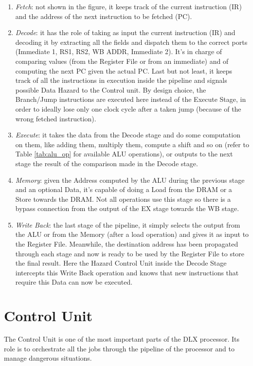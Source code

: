\begin{enumerate}
    \item \emph{Fetch}: not shown in the figure, it keeps track of the current instruction (IR) and the address of the next instruction to be fetched (PC).
    \item \emph{Decode}: it has the role of taking as input the current instruction (IR) and decoding it by extracting all the fields and dispatch them to the correct ports (Immediate 1, RS1, RS2, WB ADDR, Immediate 2). It's in charge of comparing values (from the Register File or from an immediate) and of computing the next PC given the actual PC. Last but not least, it keeps track of all the instructions in execution inside the pipeline and signals possible Data Hazard to the Control unit. By design choice, the Branch/Jump instructions are executed here instead of the Execute Stage, in order to ideally lose only one clock cycle after a taken jump (because of the wrong fetched instruction).
    \item \emph{Execute}: it takes the data from the Decode stage and do some computation on them, like adding them, multiply them, compute a shift and so on (refer to Table \ref{tab:alu_op} for available ALU operations), or outputs to the next stage the result of the comparison made in the Decode stage.
    \item \emph{Memory}: given the Address computed by the ALU during the previous stage and an optional Data, it's capable of doing a Load from the DRAM or a Store towards the DRAM. Not all operations use this stage so there is a bypass connection from the output of the EX stage towards the WB stage.
    \item \emph{Write Back}: the last stage of the pipeline, it simply selects the output from the ALU or from the Memory (after a load operation) and gives it as input to the Register File. Meanwhile, the destination address has been propagated through each stage and now is ready to be used by the Register File to store the final result. Here the Hazard Control Unit inside the Decode Stage intercepts this Write Back operation and knows that new instructions that require this Data can now be executed.
\end{enumerate}


\section{Control Unit}

The Control Unit is one of the most important parts of the DLX processor. Its role is to orchestrate all the jobs through the pipeline of the processor and to manage dangerous situations.\\

